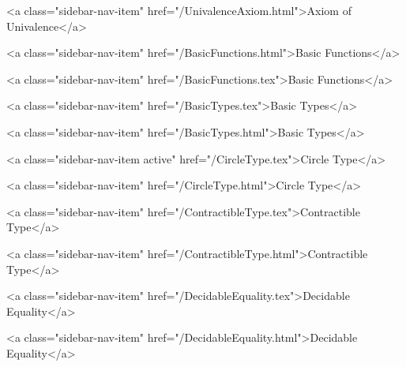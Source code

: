           <a class="sidebar-nav-item" href="/UnivalenceAxiom.html">Axiom of Univalence</a>
        
      
    
      
        
          <a class="sidebar-nav-item" href="/BasicFunctions.html">Basic Functions</a>
        
      
    
      
        
          <a class="sidebar-nav-item" href="/BasicFunctions.tex">Basic Functions</a>
        
      
    
      
        
          <a class="sidebar-nav-item" href="/BasicTypes.tex">Basic Types</a>
        
      
    
      
        
          <a class="sidebar-nav-item" href="/BasicTypes.html">Basic Types</a>
        
      
    
      
        
          <a class="sidebar-nav-item active" href="/CircleType.tex">Circle Type</a>
        
      
    
      
        
          <a class="sidebar-nav-item" href="/CircleType.html">Circle Type</a>
        
      
    
      
        
          <a class="sidebar-nav-item" href="/ContractibleType.tex">Contractible Type</a>
        
      
    
      
        
          <a class="sidebar-nav-item" href="/ContractibleType.html">Contractible Type</a>
        
      
    
      
        
          <a class="sidebar-nav-item" href="/DecidableEquality.tex">Decidable Equality</a>
        
      
    
      
        
          <a class="sidebar-nav-item" href="/DecidableEquality.html">Decidable Equality</a>
        
      
    
